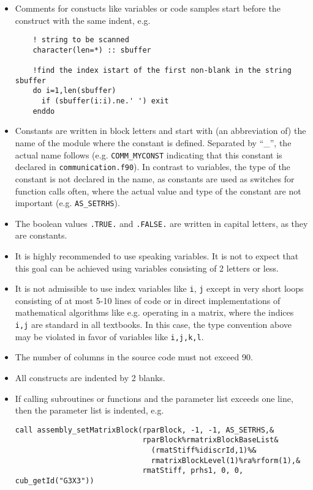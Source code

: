 \begin{itemize}
\item Comments for constucts like variables or code samples start before the construct with
the same indent, e.g.

\begin{verbatim}
    ! string to be scanned
    character(len=*) :: sbuffer

    !find the index istart of the first non-blank in the string sbuffer
    do i=1,len(sbuffer)
      if (sbuffer(i:i).ne.' ') exit
    enddo
\end{verbatim} 

\item Constants are written in block letters and start with (an abbreviation of) the name of 
the module where the constant is defined. Separated by ``\_'', the actual name follows (e.g. 
{\tt COMM\_MYCONST} indicating that this constant is declared in {\tt communication.f90}). In
contrast to variables, the type of the constant is not declared in the name, as constants are
used as switches for function calls often, where the actual value and type of the constant 
are not important (e.g. {\tt AS\_SETRHS}).

\item The boolean values {\tt .TRUE.} and {\tt .FALSE.} are written in capital letters, as they
are constants.

\item It is highly recommended to use speaking variables. It is not to expect that this goal
can be achieved using variables consisting of 2 letters or less.

\item It is not admissible to use index variables like {\tt i}, {\tt j} except in very short 
loops consisting of at most 5-10 lines of code or in direct implementations of mathematical 
algorithms like e.g. operating in a matrix, where the indices {\tt i,j} are standard in all 
textbooks. In this case, the type convention above may be violated in favor of variables like
{\tt i,j,k,l}.

\item The number of columns in the source code must not exceed 90.

\item All constructs are indented by 2 blanks.

\item If calling subroutines or functions and the parameter list exceeds one line, then the
 parameter list is indented, e.g.
\begin{verbatim}
call assembly_setMatrixBlock(rparBlock, -1, -1, AS_SETRHS,&
                             rparBlock%rmatrixBlockBaseList&
                               (rmatStiff%idiscrId,1)%&
                               rmatrixBlockLevel(1)%ra%rform(1),&
                             rmatStiff, prhs1, 0, 0, cub_getId("G3X3"))
\end{verbatim} 


\end{itemize}
